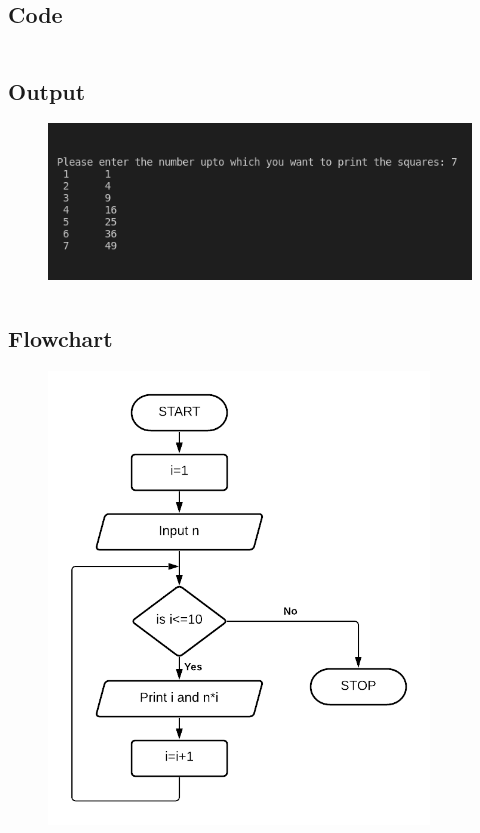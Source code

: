 \documentclass[12pt]{article}
\begin{document}
\subsection{Code}
\inputminted{c}{q1.c}
\subsection{Output}
\begin{figure}[h]
    \centering
    \includegraphics[width=1.0\textwidth]{1.png}
\end{figure}
\newpage
\section{}
\subsection{Flowchart}
\begin{figure}[h]
    \centering
    \includegraphics[width=0.9\textwidth]{Flowchart02.png}
\end{figure}
\newpage
\end{document}
